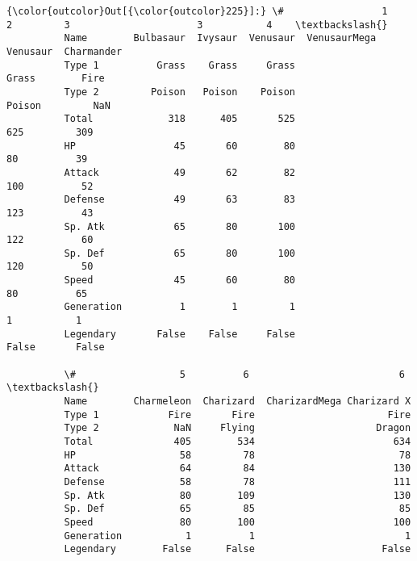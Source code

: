 \documentclass[11pt]{article}
\begin{document}
\begin{Verbatim}[commandchars=\\\{\}]
{\color{outcolor}Out[{\color{outcolor}225}]:} \#                 1        2         3                      3           4    \textbackslash{}
          Name        Bulbasaur  Ivysaur  Venusaur  VenusaurMega Venusaur  Charmander   
          Type 1          Grass    Grass     Grass                  Grass        Fire   
          Type 2         Poison   Poison    Poison                 Poison         NaN   
          Total             318      405       525                    625         309   
          HP                 45       60        80                     80          39   
          Attack             49       62        82                    100          52   
          Defense            49       63        83                    123          43   
          Sp. Atk            65       80       100                    122          60   
          Sp. Def            65       80       100                    120          50   
          Speed              45       60        80                     80          65   
          Generation          1        1         1                      1           1   
          Legendary       False    False     False                  False       False   
          
          \#                  5          6                          6    \textbackslash{}
          Name        Charmeleon  Charizard  CharizardMega Charizard X   
          Type 1            Fire       Fire                       Fire   
          Type 2             NaN     Flying                     Dragon   
          Total              405        534                        634   
          HP                  58         78                         78   
          Attack              64         84                        130   
          Defense             58         78                        111   
          Sp. Atk             80        109                        130   
          Sp. Def             65         85                         85   
          Speed               80        100                        100   
          Generation           1          1                          1   
          Legendary        False      False                      False   
          

\end{Verbatim}
\end{document}
